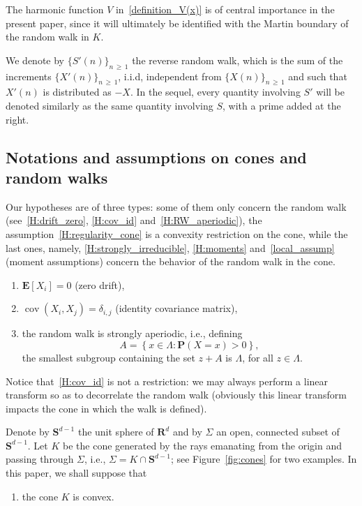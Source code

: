 \documentclass[AHL,Unicode,longabstracts,published]{cedram}
\DeclareMathOperator{\cov}{cov}
\newcommand{\pr}{\mathbf{P}}
\newcommand{\e}{\mathbf{E}}
\newcommand{\bfS}{\mathbf{S}}
\newcommand{\bfR}{\mathbf{R}}
\renewcommand{\geq}{\geqslant}
\newcommand*{\relabel}{\renewcommand{\labelenumi}{(\theenumi)}}
\newcommand*{\Henumi}{\renewcommand*{\theenumi}{H\arabic{enumi}}\relabel}
\begin{document}
The harmonic function $V$ in~\eqref{definition_V(x)} is of central importance in the present paper, since it will ultimately be identified with the Martin boundary of the random walk in ${K}$.

We denote by $\{S'(n)\}_{n\,\geq\,1}$ the reverse random walk, which is the sum of the increments $\{X'(n)\}_{n\,\geq\,1}$, i.i.d, independent from $\{X(n)\}_{n\,\geq\,1}$ and such that $X'(n)$ is distributed as $-X$. In the sequel, every quantity involving $S'$ will be denoted similarly as the same quantity involving $S$, with a prime added at the right.



\subsection*{Notations and assumptions on cones and random walks}
Our hypotheses are of three types: some of them only concern the random walk (see~\eqref{H:drift_zero}, \eqref{H:cov_id} and~\eqref{H:RW_aperiodic}), the assumption~\eqref{H:regularity_cone} is a convexity restriction on the cone, while the last ones, namely, \eqref{H:strongly_irreducible}, \eqref{H:moments} and~\eqref{local_assump} (moment assumptions) concern the behavior of the random walk in the cone.
\begin{enumerate}\Henumi
\item\label{H:drift_zero}
$\e[X_{i}]=0$ (zero drift),
\item\label{H:cov_id}
$\cov(X_{i},X_{j})=\delta_{i,j}$ (identity covariance matrix),
\item\label{H:RW_aperiodic}
the random walk is strongly aperiodic, i.e., defining
\[
A= \left\{ x\in \Lambda: \pr(X=x)>0\right\}\!,
\]
the smallest subgroup containing the set $z+A$ is $\Lambda$, for all $z\in\Lambda$.
\end{enumerate}
Notice that~\eqref{H:cov_id} is not a restriction: we may always perform a linear transform so as to decorrelate the random walk (obviously this linear transform impacts the cone in which the walk is defined).

Denote by $\bfS^{d-1}$ the unit sphere of $\bfR^d$ and by $\Sigma$ an open, connected subset of $\bfS^{d-1}$. Let $K$ be the cone generated by the rays emanating from the origin and passing through $\Sigma$, i.e., $\Sigma=K\cap \bfS^{d-1}$; see Figure~\ref{fig:cones} for two examples. In this paper, we shall suppose that
\begin{enumerate}\Henumi
\setcounter{enumi}{3}
\item\label{H:regularity_cone}
the cone $K$ is convex.
\end{enumerate}
\end{document}
